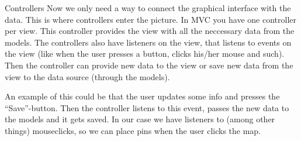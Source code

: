 Controllers
Now we only need a way to connect the graphical interface with the data. This is
where controllers enter the picture. In MVC you have one controller per view.
This controller provides the view with all the neccessary data from the models.
The controllers also have listeners on the view, that listens to events on the
view (like when the user presses a button, clicks his/her mouse and such). Then
the controller can provide new data to the view or save new data from the view
to the data source (through the models).

An example of this could be that the user updates some info and presses the 
``Save''-button. Then the controller listens to this event, passes the new data
to the models and it gets saved.
In our case we have listeners to (among other things) mouseclicks, so we can
place pins when the user clicks the map.